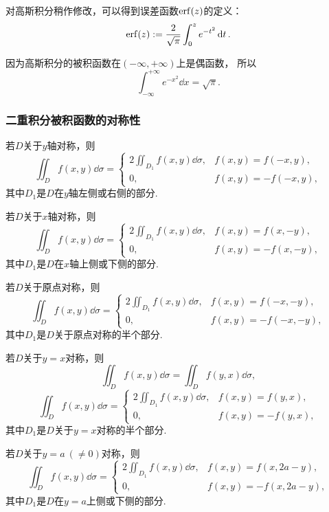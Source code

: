 \begin{remark}
对高斯积分稍作修改，可以得到误差函数\(\erf(z)\)的定义：
\begin{equation*}
	\erf(z) \defeq \frac{2}{\sqrt{\pi}} \int_0^z e^{-t^2} \dd{t}.
\end{equation*}

因为高斯积分的被积函数在\((-\infty,+\infty)\)上是偶函数，
所以\begin{equation}\label{equation:重积分.常用积分2}
	\int_{-\infty}^{+\infty} e^{-x^2} \dd{x} = \sqrt{\pi}.
\end{equation}
\end{remark}

\subsubsection{二重积分被积函数的对称性}
\begingroup
若\(D\)关于\(y\)轴对称，则\[
	\iint_D f(x,y) \dd\sigma
	= \left\{ \begin{array}{cc}
		2 \iint_{D_1} f(x,y) \dd\sigma, & f(x,y) = f(-x,y), \\
		0, & f(x,y) = -f(-x,y),
	\end{array} \right.
\]
其中\(D_1\)是\(D\)在\(y\)轴左侧或右侧的部分.

若\(D\)关于\(x\)轴对称，则\[
	\iint_D f(x,y) \dd\sigma
	= \left\{ \begin{array}{cc}
		2 \iint_{D_1} f(x,y) \dd\sigma, & f(x,y) = f(x,-y), \\
		0, & f(x,y) = -f(x,-y),
	\end{array} \right.
\]
其中\(D_1\)是\(D\)在\(x\)轴上侧或下侧的部分.

若\(D\)关于原点对称，则\[
	\iint_D f(x,y) \dd\sigma
	= \left\{ \begin{array}{cc}
		2 \iint_{D_1} f(x,y) \dd\sigma, & f(x,y) = f(-x,-y), \\
		0, & f(x,y) = -f(-x,-y),
	\end{array} \right.
\]
其中\(D_1\)是\(D\)关于原点对称的半个部分.

若\(D\)关于\(y=x\)对称，则\[
	\iint_D f(x,y) \dd\sigma = \iint_D f(y,x) \dd\sigma,
\]\[
	\iint_D f(x,y) \dd\sigma
	= \left\{ \begin{array}{cc}
		2 \iint_{D_1} f(x,y) \dd\sigma, & f(x,y) = f(y,x), \\
		0, & f(x,y) = -f(y,x),
	\end{array} \right.
\]
其中\(D_1\)是\(D\)关于\(y=x\)对称的半个部分.

若\(D\)关于\(y=a\ (\neq0)\)对称，则\[
	\iint_D f(x,y) \dd\sigma
	= \left\{ \begin{array}{cc}
		2 \iint_{D_1} f(x,y) \dd\sigma, & f(x,y) = f(x,2a-y), \\
		0, & f(x,y) = -f(x,2a-y),
	\end{array} \right.
\]
其中\(D_1\)是\(D\)在\(y=a\)上侧或下侧的部分.

